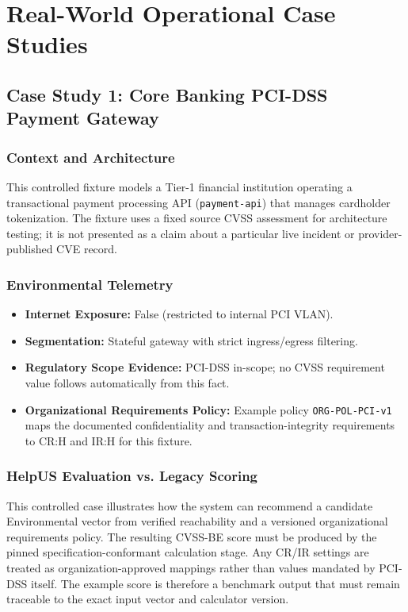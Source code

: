 \chapter{Real-World Operational Case Studies}
\label{chap:case_studies}

\section{Case Study 1: Core Banking PCI-DSS Payment Gateway}
\subsection{Context and Architecture}
This controlled fixture models a Tier-1 financial institution operating a transactional payment processing API (\texttt{payment-api}) that manages cardholder tokenization. The fixture uses a fixed source CVSS assessment for architecture testing; it is not presented as a claim about a particular live incident or provider-published CVE record.

\subsection{Environmental Telemetry}
\begin{itemize}
    \item \textbf{Internet Exposure:} False (restricted to internal PCI VLAN).
    \item \textbf{Segmentation:} Stateful gateway with strict ingress/egress filtering.
    \item \textbf{Regulatory Scope Evidence:} PCI-DSS in-scope; no CVSS requirement value follows automatically from this fact.
    \item \textbf{Organizational Requirements Policy:} Example policy \texttt{ORG-POL-PCI-v1} maps the documented confidentiality and transaction-integrity requirements to CR:H and IR:H for this fixture.
\end{itemize}

\subsection{HelpUS Evaluation vs. Legacy Scoring}
This controlled case illustrates how the system can recommend a candidate Environmental vector from verified reachability and a versioned organizational requirements policy. The resulting CVSS-BE score must be produced by the pinned specification-conformant calculation stage. Any CR/IR settings are treated as organization-approved mappings rather than values mandated by PCI-DSS itself. The example score is therefore a benchmark output that must remain traceable to the exact input vector and calculator version.

